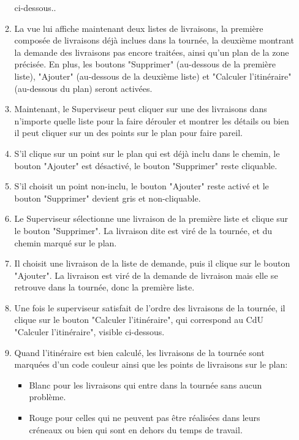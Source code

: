 \documentclass[a4paper, 10pt]{article}
\begin{document}
\begin{itemize}[label = \textbullet, font = \color{orange}]
\begin{enumerate}
            ci-dessous..
        \item La vue lui affiche maintenant deux listes de livraisons, la
            première composée de livraisons déjà inclues dans la tournée, la
            deuxième montrant la demande des livraisons pas encore traitées,
            ainsi qu'un plan de la zone précisée. En plus, les boutons
            "Supprimer" (au-dessous de la première liste), "Ajouter"
            (au-dessous de la deuxième liste) et "Calculer l'itinéraire"
            (au-dessous du plan) seront activées.
        \item Maintenant, le Superviseur peut cliquer sur une des livraisons
            dans n'importe quelle liste pour la faire dérouler et montrer les
            détails ou bien il peut cliquer sur un des points sur le plan pour
            faire pareil.
        \item S'il clique sur un point sur le plan qui est déjà inclu dans le
            chemin, le bouton "Ajouter" est désactivé, le bouton "Supprimer"
            reste cliquable.
        \item S'il choisit un point non-inclu, le bouton "Ajouter" reste activé
            et le bouton "Supprimer" devient gris et non-cliquable.
        \item Le Superviseur sélectionne une livraison de la première liste et
            clique sur le bouton "Supprimer". La livraison dite est viré de la
            tournée, et du chemin marqué sur le plan.
        \item Il choisit une livraison de la liste de demande, puis il clique
            sur le bouton "Ajouter". La livraison est viré de la demande de
            livraison mais elle se retrouve dans la tournée, donc la première
            liste.
        \item Une fois le superviseur satisfait de l'ordre des livraisons de la
            tournée, il clique sur le bouton "Calculer l'itinéraire", qui
            correspond au CdU "Calculer l'itinéraire", visible ci-dessous.
        \item Quand l'itinéraire est bien calculé, les livraisons de la tournée
            sont marquées d'un code couleur ainsi que les points de livraisons
            sur le plan:
        \begin{itemize}
            \item Blanc pour les livraisons qui entre dans la tournée sans aucun problème.
            \item Rouge pour celles qui ne peuvent pas être réalisées dans leurs créneaux ou bien qui sont en dehors du temps de travail.

\end{itemize}
\end{enumerate}
\end{itemize}
\end{document}
